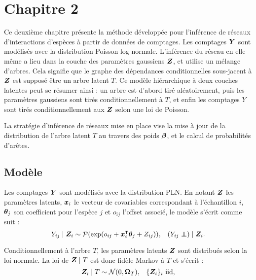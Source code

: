 \section*{Chapitre 2}
Ce deuxième chapitre présente la méthode développée pour l'inférence de réseaux d'interactions d'espèces à partir de données de comptages. Les comptages ${\boldsymbol{Y}}$ sont modélisés avec la distribution Poisson log-normale. L'inférence du réseau en elle-même a lieu dans la couche des paramètres gaussiens ${\boldsymbol{Z}}$, et utilise un mélange d'arbres. Cela signifie que le graphe des dépendances conditionnelles sous-jacent à ${\boldsymbol{Z}}$ est supposé être un arbre latent $T$. Ce modèle hiérarchique à deux couches latentes peut se résumer ainsi : un arbre est d'abord tiré aléatoirement, puis les paramètres gaussiens sont tirés conditionnellement à $T$, et enfin les comptages $Y$ sont tirés conditionnellement aux ${\boldsymbol{Z}}$ selon une loi de Poisson.

 \begin{center}
   \end{center}
   
   
   La stratégie d'inférence de réseaux mise en place vise la mise à jour de la distribution de l'arbre latent $T$ au travers des poids ${\boldsymbol{\beta}}$, et le calcul de probabilités d'arêtes.

\subsection*{Modèle}
Les comptages ${\boldsymbol{Y}}$ sont modélisés avec la distribution PLN. En notant ${\boldsymbol{Z}}$ les paramètres latents, ${\boldsymbol{x}}_i$ le vecteur de covariables correspondant à l'échantillon $i$, ${\boldsymbol{\theta}}_j$ son coefficient pour l'espèce $j$ et $o_{ij}$ l'offset associé, le modèle s'écrit comme suit :
 $$ Y_{ij}\mid \Zbf_i\sim \Pcal (\exp (o_{ij}+\xb_i^\intercal \thetab_j + Z_{ij})), \;\;\; (Y_{ij} \independent) \mid \Zbf_i .$$
 
Conditionnellement à l'arbre $T$, les paramètres latents ${\boldsymbol{Z}}$ sont distribués selon la loi normale. La loi de ${\boldsymbol{Z}}\mid T$ est donc fidèle Markov à $T$ et s'écrit :
 $${\boldsymbol{Z}}_i\mid T  \sim \mathcal{N} (0, {\boldsymbol{\Omega}}_T), \;\;\;  \{{\boldsymbol{Z}}_i\}_i \text{ iid},$$
 
